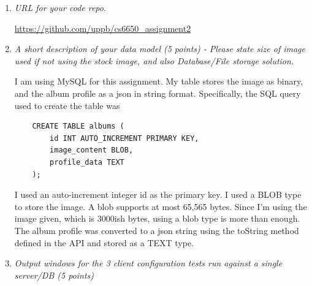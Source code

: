 \documentclass[a4paper,12pt]{article} %
\begin{document}
\begin{enumerate}

\item {\it URL for your code repo}. %

\href{https://github.com/uppb/cs6650_assignment2}{https://github.com/uppb/cs6650\_assignment2}

\item {\it A short description of your data model (5 points) - Please state size of image used if not using the stock image, and also Database/File storage solution.}

I am using MySQL for this assignment. My table stores the image as binary, and the album profile as a json in string format. Specifically,
the SQL query used to create the table was
\noindent\begin{verbatim}
    CREATE TABLE albums ( 
        id INT AUTO_INCREMENT PRIMARY KEY,     
        image_content BLOB,     
        profile_data TEXT
    );
\end{verbatim}
I used an auto-increment integer id as the primary key. I used a BLOB type to store the image. A blob supports at most 65,565 bytes. 
Since I'm using the image given, which is 3000ish bytes, using a blob type is more than enough. 
The album profile was converted to a json string using the toString method defined in the API and stored as a TEXT type. 


\newpage %
\item {\it Output windows for the 3 client configuration tests run against a single server/DB (5 points)}


\end{enumerate}
\end{document}
